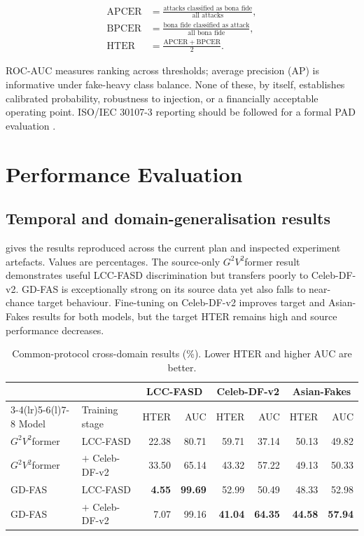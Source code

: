 \begin{align}
\mathrm{APCER} &= \frac{\text{attacks classified as bona fide}}{\text{all attacks}},\\
\mathrm{BPCER} &= \frac{\text{bona fide classified as attack}}{\text{all bona fide}},\\
\mathrm{HTER} &= \frac{\mathrm{APCER}+\mathrm{BPCER}}{2}.
\end{align}

ROC-AUC measures ranking across thresholds; average precision (AP) is informative
under fake-heavy class balance. None of these, by itself, establishes calibrated
probability, robustness to injection, or a financially acceptable operating
point. ISO/IEC 30107-3 reporting should be followed for a formal PAD evaluation
\cite{iso30107}.

\section{Performance Evaluation}

\subsection{Temporal and domain-generalisation results}
\label{sec:transfer-failure}

 gives the results reproduced across the current plan
and inspected experiment artefacts. Values are percentages. The source-only
$G^2V^2$former result demonstrates useful LCC-FASD discrimination but transfers
poorly to Celeb-DF-v2. GD-FAS is exceptionally strong on its source data yet also
falls to near-chance target behaviour. Fine-tuning on Celeb-DF-v2 improves target
and Asian-Fakes results for both models, but the target HTER remains high and
source performance decreases.

\begin{table}[H]
\centering
\caption{Common-protocol cross-domain results (\%). Lower HTER and higher AUC are
better.}
\label{tab:transfer-results}
\small
\begin{tabular}{@{}llrrrrrr@{}}
\toprule
& & \multicolumn{2}{c}{LCC-FASD} & \multicolumn{2}{c}{Celeb-DF-v2} &
\multicolumn{2}{c}{Asian-Fakes}\\
\cmidrule(lr){3-4}\cmidrule(lr){5-6}\cmidrule(l){7-8}
Model & Training stage & HTER & AUC & HTER & AUC & HTER & AUC \\
\midrule
$G^2V^2$former & LCC-FASD & 22.38 & 80.71 & 59.71 & 37.14 & 50.13 & 49.82 \\
$G^2V^2$former & $+$ Celeb-DF-v2 & 33.50 & 65.14 & 43.32 & 57.22 & 49.13 & 50.33 \\
GD-FAS & LCC-FASD & \textbf{4.55} & \textbf{99.69} & 52.99 & 50.49 & 48.33 & 52.98 \\
GD-FAS & $+$ Celeb-DF-v2 & 7.07 & 99.16 & \textbf{41.04} & \textbf{64.35} & \textbf{44.58} & \textbf{57.94} \\
\bottomrule
\end{tabular}
\end{table}

